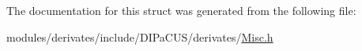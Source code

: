 The documentation for this struct was generated from the following file\+:\begin{DoxyCompactItemize}
\item 
modules/derivates/include/\+D\+I\+Pa\+C\+U\+S/derivates/\hyperlink{Misc_8h}{Misc.\+h}\end{DoxyCompactItemize}
